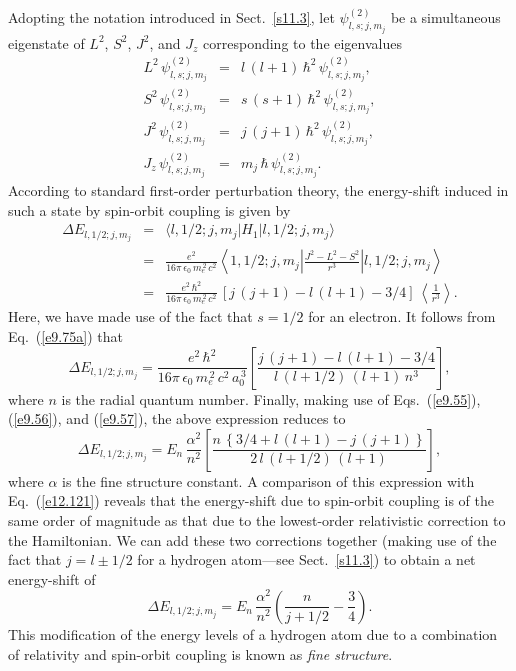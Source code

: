 Adopting the notation introduced in Sect.~\ref{s11.3}, let
$\psi^{(2)}_{l,s;j,m_j}$ be a simultaneous eigenstate of $L^2$, $S^2$,
$J^2$, and $J_z$ corresponding to the eigenvalues
\begin{eqnarray}
L^2\,\psi^{(2)}_{l,s;j,m_j} &=& l\,(l+1)\,\hbar^2\,\psi^{(2)}_{l,s;j,m_j},\\[0.5ex]
S^2\,\psi^{(2)}_{l,s;j,m_j} &=& s\,(s+1)\,\hbar^2\,\psi^{(2)}_{l,s;j,m_j},\\[0.5ex]
J^2\,\psi^{(2)}_{l,s;j,m_j} &=& j\,(j+1)\,\hbar^2\,\psi^{(2)}_{l,s;j,m_j},\\[0.5ex]
J_z\,\psi^{(2)}_{l,s;j,m_j} &=& m_j\,\hbar\,\psi^{(2)}_{l,s;j,m_j}.
\end{eqnarray}
According to standard first-order perturbation theory, the energy-shift induced in such a state
by spin-orbit coupling is given by
\begin{eqnarray}
\Delta E_{l,1/2;j,m_j} &=& \langle l,1/2;j,m_j|H_1|l,1/2;j,m_j\rangle\nonumber\\[0.5ex]
&=&  \frac{e^2}{16\pi\,\epsilon_0\,m_e^{\,2}\,c^2}\left\langle
1,1/2;j,m_j\left|\frac{J^2-L^2-S^2}{r^3}\right|l,1/2;j,m_j\right\rangle\nonumber\\[0.5ex]
&=& \frac{e^2\,\hbar^2}{16\pi\,\epsilon_0\,m_e^{\,2}\,c^2}\,\left[j\,(j+1)-l\,(l+1)-3/4\right]\,\left\langle\frac{1}{r^3}\right\rangle.
\end{eqnarray}
Here, we have made use of the fact that $s=1/2$ for an electron. It follows
from Eq.~(\ref{e9.75a}) that
\begin{equation}
\Delta E_{l,1/2;j,m_j}=  \frac{e^2\,\hbar^2}{16\pi\,\epsilon_0\,m_e^{\,2}\,c^2\,a_0^{\,3}}\left[\frac{j\,(j+1)-l\,(l+1)-3/4}{l\,(l+1/2)\,(l+1)\,n^3}\right],
\end{equation}
where $n$ is the radial quantum number. Finally, making use of Eqs.~(\ref{e9.55}), (\ref{e9.56}), and (\ref{e9.57}), the above expression reduces to
\begin{equation}\label{e12.137}
\Delta E_{l,1/2;j,m_j}=  E_n\,\frac{\alpha^2}{n^2}\left[
\frac{n\,\left\{3/4+l\,(l+1)-j\,(j+1)\right\}}{2\,l\,(l+1/2)\,(l+1)}\right],
\end{equation}
where $\alpha$ is the fine structure constant. A comparison of this
expression with Eq.~(\ref{e12.121}) reveals that the energy-shift
due to spin-orbit coupling is of the same order of magnitude as that due
to the lowest-order relativistic correction to the Hamiltonian. We can
add these two corrections together (making use of the fact that
$j=l\pm 1/2$ for a hydrogen atom---see Sect.~\ref{s11.3}) to obtain
a net energy-shift of
\begin{equation}\label{e12.138}
\Delta E_{l,1/2;j,m_j}=  E_n\,\frac{\alpha^2}{n^2}\left(\frac{n}{j+1/2}-\frac{3}{4}\right).
\end{equation}
This modification of the energy levels of a hydrogen atom due to a combination
of relativity and spin-orbit coupling is
known as {\em fine structure}. 

